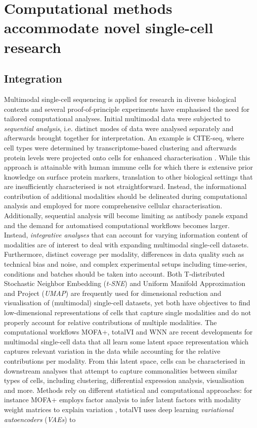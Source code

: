 \documentclass[times, twoside, watermark]{zHenriquesLab-StyleBioRxiv}
\begin{document}
\section*{Computational methods accommodate novel single-cell research}

\subsection*{Integration}
Multimodal single-cell sequencing is applied for research in diverse biological contexts and several proof-of-principle experiments have emphasised the need for tailored computational analyses. Initial multimodal data were subjected to \textit{sequential analysis}, i.e. distinct modes of data were analysed separately and afterwards brought together for interpretation. An example is CITE-seq, where cell types were determined by transcriptome-based clustering and afterwards protein levels were projected onto cells for enhanced characterisation \cite{Stoeckius2017}. While this approach is attainable with human immune cells for which there is extensive prior knowledge on surface protein markers, translation to other biological settings that are insufficiently characterised is not straightforward. Instead, the informational contribution of additional modalities should be delineated during computational analysis and employed for more comprehensive cellular characterisation. Additionally, sequential analysis will become limiting as antibody panels expand and the demand for automatised computational workflows becomes larger. Instead, \textit{integrative analyses} that can account for varying information content of modalities are of interest to deal with expanding multimodal single-cell datasets. Furthermore, distinct coverage per modality, differences in data quality such as technical bias and noise, and complex experimental setups including time-series, conditions and batches should be taken into account. Both T-distributed Stochastic Neighbor Embedding (\textit{t-SNE}) \cite{vanderMaaten2008} and Uniform Manifold Approximation and Project (\textit{UMAP}) \cite{McInnes2018} are frequently used for dimensional reduction and visualisation of (multimodal) single-cell datasets, yet both have objectives to find low-dimensional representations of cells that capture single modalities and do not properly account for relative contributions of multiple modalities. \newline The computational workflows MOFA+, totalVI and WNN \cite{Argelaguet2020,Gayoso2021,Hao2021} are recent developments for multimodal single-cell data that all learn some latent space representation which captures relevant variation in the data while accounting for the relative contributions per modality. From this latent space, cells can be characterised in downstream analyses that attempt to capture commonalities between similar types of cells, including clustering, differential expression analysis, visualisation and more. Methods rely on different statistical and computational approaches: for instance MOFA+ employs factor analysis to infer latent factors with modality weight matrices to explain variation \cite{Argelaguet2020}, totalVI uses deep learning \textit{variational autoencoders} (\textit{VAEs}) to 
\end{document}
